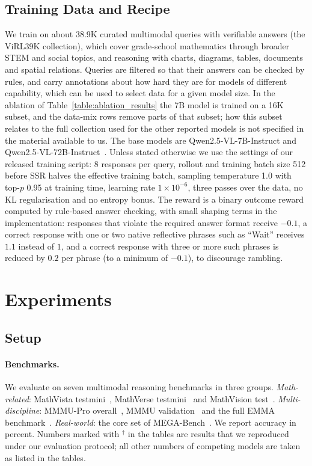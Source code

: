 \documentclass{article}
\begin{document}
\subsection{Training Data and Recipe}
\label{sec:recipe}

We train on about 38.9K curated multimodal queries with verifiable answers (the ViRL39K collection), which cover grade-school mathematics through broader STEM and social topics, and reasoning with charts, diagrams, tables, documents and spatial relations. Queries are filtered so that their answers can be checked by rules, and carry annotations about how hard they are for models of different capability, which can be used to select data for a given model size. In the ablation of Table~\ref{table:ablation_results} the 7B model is trained on a 16K subset, and the data-mix rows remove parts of that subset; how this subset relates to the full collection used for the other reported models is not specified in the material available to us. The base models are Qwen2.5-VL-7B-Instruct and Qwen2.5-VL-72B-Instruct~\citep{qwen2_5_vl}. Unless stated otherwise we use the settings of our released training script: 8 responses per query, rollout and training batch size 512 before SSR halves the effective training batch, sampling temperature 1.0 with top-$p$ 0.95 at training time, learning rate $1\times 10^{-6}$, three passes over the data, no KL regularisation and no entropy bonus. The reward is a binary outcome reward computed by rule-based answer checking, with small shaping terms in the implementation: responses that violate the required answer format receive $-0.1$, a correct response with one or two native reflective phrases such as ``Wait'' receives $1.1$ instead of $1$, and a correct response with three or more such phrases is reduced by $0.2$ per phrase (to a minimum of $-0.1$), to discourage rambling.

\section{Experiments}
\label{sec:exp}

\subsection{Setup}
\label{sec:setup}

\paragraph{Benchmarks.} We evaluate on seven multimodal reasoning benchmarks in three groups. \emph{Math-related}: MathVista testmini~\citep{mathvista}, MathVerse testmini~\citep{mathverse} and MathVision test~\citep{mathvision}. \emph{Multi-discipline}: MMMU-Pro overall~\citep{mmmupro}, MMMU validation~\citep{yue2024mmmu} and the full EMMA benchmark~\citep{emma}. \emph{Real-world}: the core set of MEGA-Bench~\citep{chen2024mega}. We report accuracy in percent. Numbers marked with $^\dagger$ in the tables are results that we reproduced under our evaluation protocol; all other numbers of competing models are taken as listed in the tables.
\end{document}
